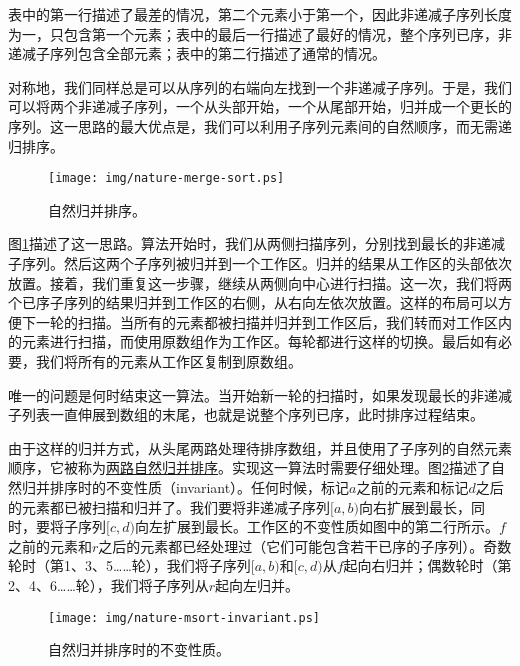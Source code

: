 \documentclass[UTF8]{article}
\begin{document}
表中的第一行描述了最差的情况，第二个元素小于第一个，因此非递减子序列长度为一，只包含第一个元素；表中的最后一行描述了最好的情况，整个序列已序，非递减子序列包含全部元素；表中的第二行描述了通常的情况。

对称地，我们同样总是可以从序列的右端向左找到一个非递减子序列。于是，我们可以将两个非递减子序列，一个从头部开始，一个从尾部开始，归并成一个更长的序列。这一思路的最大优点是，我们可以利用子序列元素间的自然顺序，而无需递归排序。

\begin{figure}[htbp]
 \centering
 \texttt{[image: img/nature-merge-sort.ps]}
 \caption{自然归并排序。}
 \label{fig:nature-merge-sort}
\end{figure}

图\ref{fig:nature-merge-sort}描述了这一思路。算法开始时，我们从两侧扫描序列，分别找到最长的非递减子序列。然后这两个子序列被归并到一个工作区。归并的结果从工作区的头部依次放置。接着，我们重复这一步骤，继续从两侧向中心进行扫描。这一次，我们将两个已序子序列的结果归并到工作区的右侧，从右向左依次放置。这样的布局可以方便下一轮的扫描。当所有的元素都被扫描并归并到工作区后，我们转而对工作区内的元素进行扫描，而使用原数组作为工作区。每轮都进行这样的切换。最后如有必要，我们将所有的元素从工作区复制到原数组。

唯一的问题是何时结束这一算法。当开始新一轮的扫描时，如果发现最长的非递减子列表一直伸展到数组的末尾，也就是说整个序列已序，此时排序过程结束。

由于这样的归并方式，从头尾两路处理待排序数组，并且使用了子序列的自然元素顺序，它被称为\underline{两路自然归并排序}。实现这一算法时需要仔细处理。图\ref{fig:nature-msort-invariant}描述了自然归并排序时的不变性质（invariant）。任何时候，标记$a$之前的元素和标记$d$之后的元素都已被扫描和归并了。我们要将非递减子序列$[a, b)$向右扩展到最长，同时，要将子序列$[c, d)$向左扩展到最长。工作区的不变性质如图中的第二行所示。$f$之前的元素和$r$之后的元素都已经处理过（它们可能包含若干已序的子序列）。奇数轮时（第1、3、5……轮），我们将子序列$[a, b)$和$[c, d)$从$f$起向右归并；偶数轮时（第2、4、6……轮），我们将子序列从$r$起向左归并。

\begin{figure}[htbp]
 \centering
 \texttt{[image: img/nature-msort-invariant.ps]}
 \caption{自然归并排序时的不变性质。}
 \label{fig:nature-msort-invariant}
\end{figure}
\end{document}
